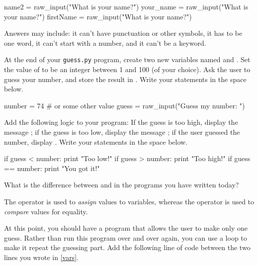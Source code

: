 \begin{pythlst}
    name2 = raw_input("What is your name?")
    your_name = raw_input("What is your name?")
    firstName = raw_input("What is your name?")
\end{pythlst}

\begin{answer}
Answers may include: it can't have punctuation or other symbols, it has to be one word, it can't start with a number, and it can't be a keyword.
\end{answer}


\Q \label{vars} At the end of your \texttt{guess.py} program, create two new variables named  and .
Set the value of  to be an integer between 1 and 100 (of your choice).
Ask the user to guess your number, and store the result in .
Write your statements in the space below.

\begin{answer}
\begin{pythans}
number = 74  # or some other value
guess = raw_input("Guess my number: ")
\end{pythans}
\end{answer}


\Q Add the following logic to your program:
If the guess is too high, display the message ;
if the guess is too low, display the message ;
if the user guessed the number, display .
Write your statements in the space below.

\begin{answer}[9em]
\begin{pythans}
    if guess < number:
        print "Too low!"
    if guess > number:
        print "Too high!"
    if guess == number:
        print "You got it!"
\end{pythans}
\end{answer}


\Q What is the difference between \pyth{=} and \pyth{==} in the programs you have written today?

\begin{answer}
The \pyth{=} operator is used to \emph{assign} values to variables, whereas the \pyth{==} operator is used to \emph{compare} values for equality.
\end{answer}


\Q At this point, you should have a program that allows the user to make only one guess.
Rather than run this program over and over again, you can use a  loop to make it repeat the guessing part.
Add the following line of code between the two lines you wrote in \ref{vars}.

